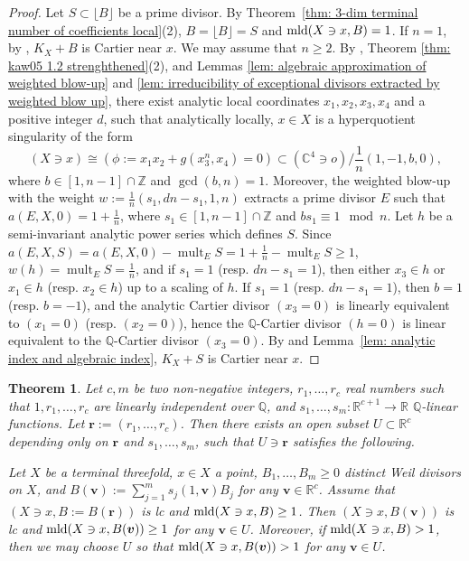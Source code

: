 \documentclass[11pt]{amsart}
\numberwithin{equation}{section}
\newcommand{\Qq}{\mathbb{Q}}
\newcommand{\Zz}{\mathbb{Z}}
\newcommand{\mld}{{\rm{mld}}}
\newcommand{\mult}{\operatorname{mult}}
\newtheorem{thm}{Theorem}[section]
\theoremstyle{definition}
\theoremstyle{definition}
\begin{document}
\begin{proof}
Let $S\subset\lfloor B\rfloor$ be a prime divisor. By Theorem~\ref{thm: 3-dim terminal number of coefficients local}(2), $B=\lfloor B\rfloor=S$ and $\mld(X\ni x, B)=1$. If $n=1$, by \cite[Lemma 5.1]{Kaw88}, $K_X+B$ is Cartier near $x$. We may assume that $n\geq 2$. By \cite[Theorem 1.3]{Kaw05}, Theorem \ref{thm: kaw05 1.2 strenghthened}(2), and Lemmas \ref{lem: algebraic approximation of weighted blow-up} and \ref{lem: irreducibility of exceptional divisors extracted by weighted blow up}, there exist analytic local coordinates $x_1,x_2,x_3,x_4$ and a positive integer $d$, such that analytically locally, $x\in X$ is a hyperquotient singularity of the form $$(X\ni x)\cong (\phi:= x_1x_2+g(x_3^n,x_4)=0)\subset (\mathbb C^4\ni o)/\frac{1}{n}(1,-1,b,0),$$
where $b\in [1,n-1]\cap \Zz$ and $\gcd(b,n)=1$. Moreover, the weighted blow-up with the weight $w:=\frac{1}{n}(s_1,dn-s_1,1,n)$ extracts a prime divisor $E$ such that $a(E,X,0)=1+\frac{1}{n}$, where $s_1\in [1,n-1]\cap \Zz$ and $bs_1\equiv 1\mod n$. Let $h$ be a semi-invariant analytic power series which defines $S$. Since $a(E,X,S)=a(E,X,0)-\mult_E S=1+\frac{1}{n}-\mult_E S\geq 1$, $w(h)=\mult_E S=\frac{1}{n}$, and if $s_1=1$ (resp. $dn-s_1=1$), then either $x_3\in h$ or $x_1\in h$ (resp. $x_2\in h$) up to a scaling of $h$. If $s_1=1$ (resp. $dn-s_1=1$), then $b=1$ (resp. $b=-1$), and the analytic Cartier divisor $(x_3=0)$ is linearly equivalent to $(x_1=0)$ (resp. $(x_2=0)$), hence the $\Qq$-Cartier divisor $(h=0)$ is linear equivalent to the $\Qq$-Cartier divisor $(x_3=0)$. By \cite[(6.4)(B.1)]{Rei87} and Lemma~\ref{lem: analytic index and algebraic index}, $K_X+S$ is Cartier near $x$.
\end{proof}



\begin{thm}\label{thm: uniform canonical polytope}
Let $c,m$ be two non-negative integers, $r_1,\dots,r_c$ real numbers such that $1,r_1,\dots,r_c$ are linearly independent over $\Qq$, and $s_1,\dots,s_m:\mathbb R^{c+1}\rightarrow\mathbb R$ $\Qq$-linear functions. Let $\bm{r}:=(r_1,\dots,r_c)$. Then there exists an open subset $U\subset\mathbb R^c$ depending only on $\bm{r}$ and $s_1,\dots,s_m$, such that $U\ni\bm{r}$ satisfies the following.

Let $X$ be a terminal threefold, $x\in X$ a point, $B_1,\dots,B_m\geq 0$ distinct Weil divisors on $X$, and $B(\bm{v}):=\sum_{j=1}^ms_j(1,\bm{v})B_j$ for any $\bm{v}\in\mathbb R^c$. Assume that $(X\ni x,B:=B(\bm{r}))$ is lc and $\mld(X\ni x, B)\geq 1$. Then $(X\ni x,B(\bm{v}))$ is lc and $\mld(X\ni x, B(\bm{v}))\geq 1$ for any $\bm{v}\in U$. Moreover, if $\mld(X\ni x, B)> 1$, then we may choose $U$ so that $\mld(X\ni x, B(\bm{v}))> 1$ for any $\bm{v}\in U$.
\end{thm}
\end{document}
